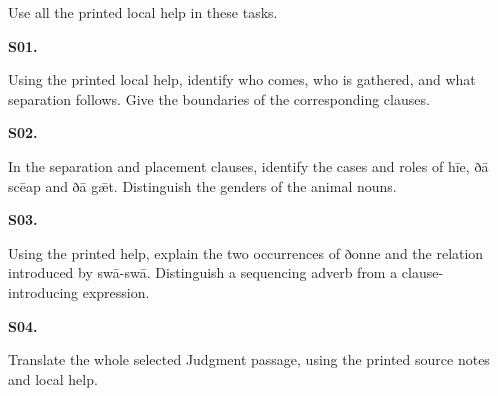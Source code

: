Use all the printed local help in these tasks.

\par\begin{minipage}{\linewidth}\raggedright
\textbf{S01.}

Using the printed local help, identify who comes, who is gathered, and what separation follows. Give the boundaries of the corresponding clauses.

\end{minipage}\par\addvspace{4pt}

\par\begin{minipage}{\linewidth}\raggedright
\textbf{S02.}

In the separation and placement clauses, identify the cases and roles of hīe, ðā scēap and ðā gǣt. Distinguish the genders of the animal nouns.

\end{minipage}\par\addvspace{4pt}

\par\begin{minipage}{\linewidth}\raggedright
\textbf{S03.}

Using the printed help, explain the two occurrences of ðonne and the relation introduced by swā-swā. Distinguish a sequencing adverb from a clause-introducing expression.

\end{minipage}\par\addvspace{4pt}

\par\begin{minipage}{\linewidth}\raggedright
\textbf{S04.}

Translate the whole selected Judgment passage, using the printed source notes and local help.

\end{minipage}\par\addvspace{4pt}

